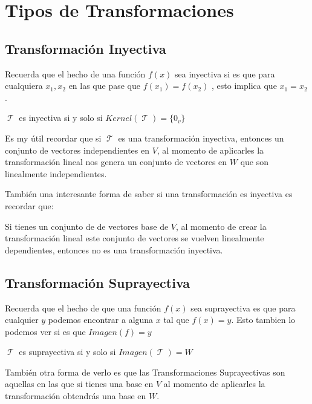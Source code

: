 \documentclass[12pt]{report}                                    %
\DeclareMathOperator \LinealTransformation {\mathcal{T}}        %
\DeclareMathOperator \LT {\mathcal{T}}                          %
\begin{document}
\chapter{Tipos de Transformaciones}

    \clearpage

    \section{Transformación Inyectiva}
        Recuerda que el hecho de una función $f(x)$ sea inyectiva si es que para cualquiera $x_1, x_2$
        en las que pase que $f(x_1) = f(x_2)$ , esto implica que $x_1 = x_2$.

        $\LinealTransformation$ es inyectiva si y solo si $Kernel(\LinealTransformation) = \{0_v\}$

        Es my útil recordar que si $\LT$ es una transformación inyectiva, entonces un conjunto
        de vectores independientes en $V$, al momento de aplicarles la transformación lineal
        nos genera un conjunto de vectores en $W$ que son linealmente independientes.

        También una interesante forma de saber si una transformación es inyectiva es recordar que:

        Si tienes un conjunto de de vectores base de $V$, al momento de crear la transformación lineal
        este conjunto de vectores se vuelven linealmente dependientes, entonces no es una 
        transformación inyectiva.

    \section{Transformación Suprayectiva}
        Recuerda que el hecho de que una función $f(x)$ sea suprayectiva es que para cualquier
        $y$ podemos encontrar a alguna $x$ tal que $f(x)=y$. Esto tambien lo podemos ver si es que $Imagen(f)= y$

        $\LinealTransformation$ es suprayectiva si y solo si $Imagen(\LT) = W$

        También otra forma de verlo es que las Transformaciones Suprayectivas son aquellas en las que si
        tienes una base en $V$ al momento de aplicarles la transformación obtendrás una base en $W$.
\end{document}
